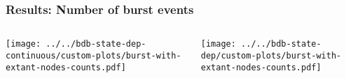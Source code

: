 \begin{frame}
    \frametitle{Results: Number of burst events}

    \begin{columns}[T]
        \begin{minipage}[c][0.75\frametextheight][c]{\columnwidth}
            \begin{center}

                \texttt{[image: ../../bdb-state-dep-continuous/custom-plots/burst-with-extant-nodes-counts.pdf]}
            \end{center}
        \end{minipage}

        \begin{minipage}[c][0.75\frametextheight][c]{\columnwidth}
            \begin{center}

                \texttt{[image: ../../bdb-state-dep/custom-plots/burst-with-extant-nodes-counts.pdf]}
            \end{center}
        \end{minipage}

    \end{columns}

    \begin{center}
    \end{center}
\end{frame}

